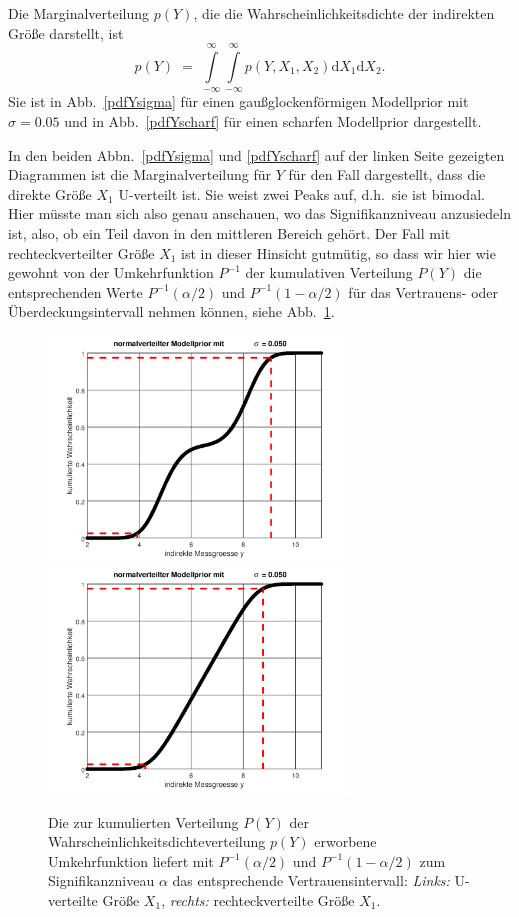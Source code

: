 Die Marginalverteilung $p(Y)$, die die Wahrscheinlichkeitsdichte der indirekten Größe darstellt, ist
\begin{equation}
p(Y) \; = \;  \int\limits_{-\infty}^{\infty}
\int\limits_{-\infty}^{\infty} p(Y,X_1,X_2) \mathrm{d}X_1 \mathrm{d}X_2 .
\label{pYmarginal}
\end{equation}
Sie ist in Abb.~\ref{pdfYsigma} für einen gaußglockenförmigen Modellprior mit $\sigma = 0.05$ und in
Abb.~\ref{pdfYscharf} für einen scharfen Modellprior dargestellt.

In den beiden Abbn.~\ref{pdfYsigma} und \ref{pdfYscharf} auf der linken Seite gezeigten
Diagrammen ist die Marginalverteilung für $Y$ für den Fall dargestellt, dass die direkte Größe
$X_1$ U-verteilt ist. Sie weist zwei Peaks auf, d.h.\ sie ist bimodal.
Hier müsste man sich also genau anschauen, wo das Signifikanzniveau anzusiedeln ist, also, ob ein
Teil davon in den mittleren Bereich gehört. Der Fall mit rechteckverteilter Größe $X_1$ ist
in dieser Hinsicht gutmütig, so dass wir hier wie gewohnt von der Umkehrfunktion $P^{-1}$ der kumulativen
Verteilung $P(Y)$ die entsprechenden Werte $P^{-1}(\alpha/2)$ und $P^{-1}(1-\alpha/2)$ für
das Vertrauens- oder Überdeckungsintervall nehmen können,
siehe Abb.~\ref{PkumY}.
\begin{figure}
	\begin{center}
	\includegraphics[width=80mm]{11_vorlesung_GUMS1/media/Pkum_indirekte_y_Gauss_sigma0p050.png}
		\hspace{2mm}
	\includegraphics[width=80mm]{11_vorlesung_GUMS1/media/Pkum_indirekte_y_Gauss_sigma0p050_box.png}
		\caption{Die zur kumulierten Verteilung $P(Y)$ der Wahrscheinlichkeitsdichteverteilung $p(Y)$
			erworbene Umkehrfunktion liefert mit $P^{-1}(\alpha/2)$ und $P^{-1}(1-\alpha/2)$ zum
			Signifikanzniveau $\alpha$ das entsprechende Vertrauensintervall:
			\textsl{Links:} U-verteilte Größe $X_1$,
			\textsl{rechts:} rechteckverteilte Größe $X_1$.}
		\label{PkumY}
	\end{center}
\end{figure}
